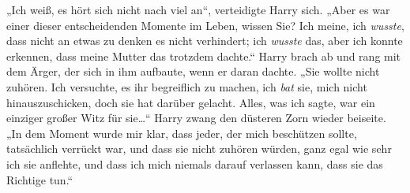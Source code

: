 „Ich weiß, es hört sich nicht nach viel an“, verteidigte Harry sich. „Aber es war einer dieser entscheidenden Momente im Leben, wissen Sie? Ich meine, ich \emph{wusste}, dass nicht an etwas zu denken es nicht verhindert; ich \emph{wusste} das, aber ich konnte erkennen, dass meine Mutter das trotzdem dachte.“ Harry brach ab und rang mit dem Ärger, der sich in ihm aufbaute, wenn er daran dachte. „Sie wollte nicht zuhören. Ich versuchte, es ihr begreiflich zu machen, ich \emph{bat} sie, mich nicht hinauszuschicken, doch sie hat darüber gelacht. Alles, was ich sagte, war ein einziger großer Witz für sie…“ Harry zwang den düsteren Zorn wieder beiseite. „In dem Moment wurde mir klar, dass jeder, der mich beschützen sollte, tatsächlich verrückt war, und dass sie nicht zuhören würden, ganz egal wie sehr ich sie anflehte, und dass ich mich niemals darauf verlassen kann, dass sie das Richtige tun.“

